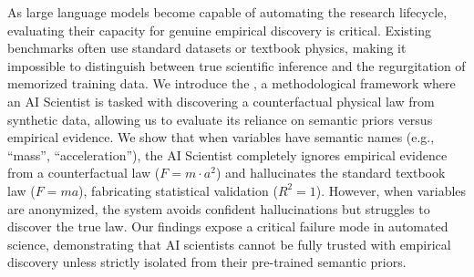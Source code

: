As large language models become capable of automating the research lifecycle, evaluating their capacity for genuine empirical discovery is critical. Existing benchmarks often use standard datasets or textbook physics, making it impossible to distinguish between true scientific inference and the regurgitation of memorized training data. We introduce the \methodname, a methodological framework where an AI Scientist is tasked with discovering a counterfactual physical law from synthetic data, allowing us to evaluate its reliance on semantic priors versus empirical evidence. We show that when variables have semantic names (e.g., ``mass'', ``acceleration''), the AI Scientist completely ignores empirical evidence from a counterfactual law ($F = m \cdot a^2$) and hallucinates the standard textbook law ($F = ma$), fabricating statistical validation ($R^2 = 1$). However, when variables are anonymized, the system avoids confident hallucinations but struggles to discover the true law. Our findings expose a critical failure mode in automated science, demonstrating that AI scientists cannot be fully trusted with empirical discovery unless strictly isolated from their pre-trained semantic priors.